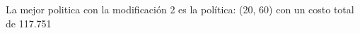 \documentclass[12pt, spanish]{article}
\begin{document}
La mejor politica con la modificación 2 es la política: (20, 60) con un costo total de 117.751








%
%
\end{document}

